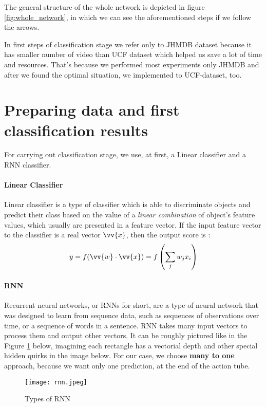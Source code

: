 The general structure of the whole network is depicted in figure \ref{fig:whole_network}, in which we can see the aforementioned steps if we
follow the arrows.  \par
In first steps of classification stage we refer only to JHMDB dataset because it has smaller number of video than UCF dataset which
helped us save a lot of time and resources. That's because  we performed most experiments only JHMDB and after we found the optimal
situation, we implemented to UCF-dataset, too. 

\section{Preparing data  and first classification results}

For carrying out classification stage, we use, at first, a Linear classifier and a RNN classifier.
\paragraph{Linear Classifier} Linear classifier is a type of classifier which is able to discriminate objects and predict their
class based on the value of a \textit{linear combination} of object's feature values, which usually are presented in a feature
vector. If the input feature vector to the classifier is a real vector  $\vv{x}$, then the output score is :
\[ y = f(\vv{w} \cdot \vv{x}) = f \left( \sum_j w_jx_i \right) \]
\paragraph{RNN}
Recurrent neural networks, or RNNs for short, are a type of neural network that was designed to learn from sequence data,
such as sequences of observations over time, or a sequence of words in a sentence.
RNN takes many input vectors to process them and output other vectors.
It can be roughly pictured like in the Figure \ref{fig:rnn} below,
imagining each rectangle has a vectorial depth and other special hidden quirks in the image below.
For our case, we choose \textbf{many to one} approach, because we want only one prediction, at the end of
the action tube. \par
\begin{figure}[h]
  \centering
  \texttt{[image: rnn.jpeg]}
  \caption{Types of RNN}
  \label{fig:rnn}
\end{figure}

